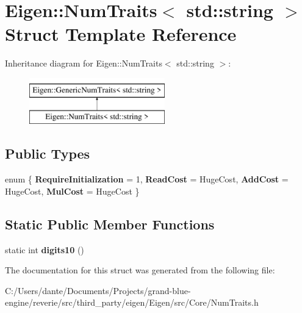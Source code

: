 \hypertarget{struct_eigen_1_1_num_traits_3_01std_1_1string_01_4}{}\section{Eigen\+::Num\+Traits$<$ std\+::string $>$ Struct Template Reference}
\label{struct_eigen_1_1_num_traits_3_01std_1_1string_01_4}
Inheritance diagram for Eigen\+::Num\+Traits$<$ std\+::string $>$\+:\begin{figure}[H]
\begin{center}
\leavevmode
\includegraphics[height=2.000000cm]{struct_eigen_1_1_num_traits_3_01std_1_1string_01_4}
\end{center}
\end{figure}
\subsection*{Public Types}
\begin{DoxyCompactItemize}
\item 
\mbox{\label{struct_eigen_1_1_num_traits_3_01std_1_1string_01_4_a59d15f37c07a9188e7c376025cbe1345}} 
enum \{ {\bfseries Require\+Initialization} = 1, 
{\bfseries Read\+Cost} = Huge\+Cost, 
{\bfseries Add\+Cost} = Huge\+Cost, 
{\bfseries Mul\+Cost} = Huge\+Cost
 \}
\end{DoxyCompactItemize}
\subsection*{Static Public Member Functions}
\begin{DoxyCompactItemize}
\item 
\mbox{\label{struct_eigen_1_1_num_traits_3_01std_1_1string_01_4_a7da9ef6dfd4af0991132f3a8a0149561}} 
static int {\bfseries digits10} ()
\end{DoxyCompactItemize}


The documentation for this struct was generated from the following file\+:\begin{DoxyCompactItemize}
\item 
C\+:/\+Users/dante/\+Documents/\+Projects/grand-\/blue-\/engine/reverie/src/third\+\_\+party/eigen/\+Eigen/src/\+Core/Num\+Traits.\+h\end{DoxyCompactItemize}
